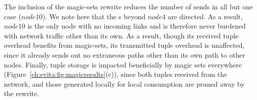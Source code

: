 The inclusion of the magic-sets rewrite reduces the number of sends in all but
one case ($node10$).  We note here that the s beyond $node4$ are
directed.  As a result, $node10$ is the only node with no incoming links and is
therefore never burdened with network traffic other than its own.  As a result,
though its received tuple overhead benefits from magic-sets, its transmitted
tuple overhead is unaffected, since it already sends out no extraneous paths
other than its own path to other nodes.  Finally, tuple storage is impacted
beneficially by magic sets everywhere
(Figure~\ref{ch:evita:fig:magicresults}(c)), since both  tuples
received from the network, and those generated locally for local consumption
are pruned away by the rewrite.



